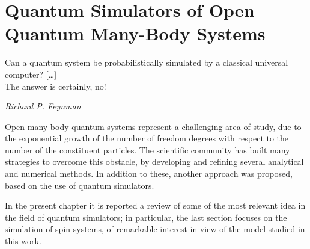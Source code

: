 
\chapter{Quantum Simulators of Open Quantum Many-Body Systems}
\label{chapter2}
\epigraph{Can a quantum system be probabilistically simulated by a classical universal computer? [\dots] \\The answer is certainly, no!}{\textit{Richard P. Feynman}}

Open many-body quantum systems represent a challenging area of study, due to the exponential growth of the number of freedom degrees with respect to the number of the constituent particles. The scientific community has built many strategies to overcome this obstacle, by developing and refining several analytical and numerical methods. In addition to these, another approach was proposed, based on the use of quantum simulators.

In the present chapter it is reported a review of some of the most relevant idea in the field of quantum simulators; in particular, the last section focuses on the simulation of spin systems, of remarkable interest in view of the model studied in this work.

